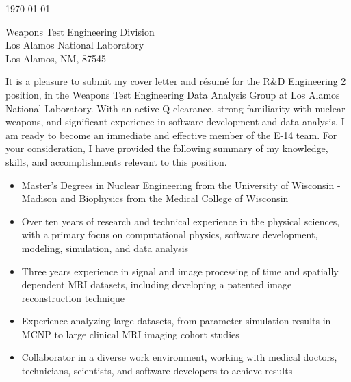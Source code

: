 
\begin{center}
\begin{minipage}{\textwidth}

  \normalsize

  \vspace{6mm} 

  \today \\
  \vspace{4mm}
	
	Weapons Test Engineering Division \\
	Los Alamos National Laboratory \\
	Los Alamos, NM, 87545 \\
  
  \vspace{4mm} 


	It is a pleasure to submit my cover letter and r\'{e}sum\'{e} for the R\&D Engineering 2 position, in the Weapons Test Engineering Data Analysis Group at Los Alamos National Laboratory.
  With an active Q-clearance, strong familiarity with nuclear weapons, and significant experience in software development and data analysis, I am ready to become an immediate and effective member of the E-14 team.
  For your consideration, I have provided the following summary of my knowledge, skills, and accomplishments relevant to this position. \\

  \begin{itemize}[leftmargin=.45in,rightmargin=.45in,itemsep=1.6mm]

	\item Master's Degrees in Nuclear Engineering from the University of Wisconsin - Madison and Biophysics from the Medical College of Wisconsin
	\item Over ten years of research and technical experience in the physical sciences, with a primary focus on computational physics, software development, modeling, simulation, and data analysis
	\item Three years experience in signal and image processing of time and spatially dependent MRI datasets, including developing a patented image reconstruction technique
	\item Experience analyzing large datasets, from parameter simulation results in MCNP to large clinical MRI imaging cohort studies %
	\item Collaborator in a diverse work environment, working with medical doctors, technicians, scientists, and software developers to achieve results


\end{itemize}
\end{minipage}
\end{center}
